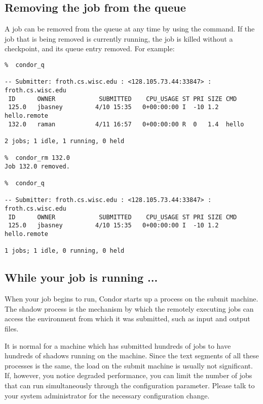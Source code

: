\subsection{Removing the job from the queue}
A job can be removed from the queue at any time by using the 
command.  If the job that is being removed is currently running, the job
is killed without a checkpoint, and its queue entry removed.  For example:
\begin{verbatim}
%  condor_q

-- Submitter: froth.cs.wisc.edu : <128.105.73.44:33847> : froth.cs.wisc.edu
 ID      OWNER            SUBMITTED    CPU_USAGE ST PRI SIZE CMD               
 125.0   jbasney         4/10 15:35   0+00:00:00 I  -10 1.2  hello.remote      
 132.0   raman           4/11 16:57   0+00:00:00 R  0   1.4  hello             

2 jobs; 1 idle, 1 running, 0 held

%  condor_rm 132.0
Job 132.0 removed.

%  condor_q

-- Submitter: froth.cs.wisc.edu : <128.105.73.44:33847> : froth.cs.wisc.edu
 ID      OWNER            SUBMITTED    CPU_USAGE ST PRI SIZE CMD               
 125.0   jbasney         4/10 15:35   0+00:00:00 I  -10 1.2  hello.remote      

1 jobs; 1 idle, 0 running, 0 held
\end{verbatim}

\subsection{While your job is running ...}
When your job begins to run, Condor starts up a  process
on the submit machine.  The shadow process is the mechanism by which the
remotely executing jobs can access the environment from which it was
submitted, such as input and output files.  

It is normal for a machine which has submitted hundreds of jobs to have 
hundreds of shadows running on the machine.  Since the text segments of 
all these processes is the same, the load on the submit machine is usually 
not significant.  If, however, you notice degraded performance, you can limit 
the number of jobs that can run simultaneously through the 
 configuration parameter.  Please talk to your 
system administrator for the necessary configuration change.

